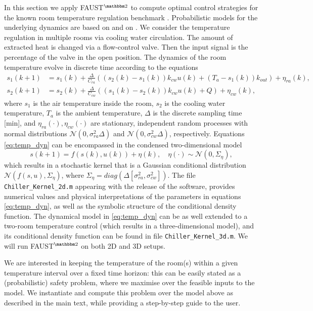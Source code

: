 \documentclass{llncs}
\newcommand{\software}{\textsf{FAUST}$^{\mathbbm 2}$\xspace}
\begin{document}
In this section we apply \software to compute optimal control strategies for the known room temperature regulation benchmark \cite{FI04}.  
Probabilistic models for the underlying dynamics are based on \cite{MC85} and on \cite{APLS08}.
We consider the temperature regulation in multiple rooms via cooling water circulation.
The amount of extracted heat is changed via a flow-control valve.
Then the input signal is the percentage of the valve in the open position. 
The dynamics of the room temperature evolve in discrete time according to the equations 
\begin{align}
s_1(k+1)& = s_1(k)+\frac{\Delta}{C_{ra}}((s_2(k)-s_1(k))k_{cw}u(k)+(T_a-s_1(k))k_{out})+\eta_{ra}(k),\nonumber\\
s_2(k+1)& = s_2(k)+\frac{\Delta}{C_{cw}}((s_1(k)-s_2(k))k_{cw}u(k)+Q)+\eta_{cw}(k),\label{eq:temp_dyn}
\end{align}
where $s_1$ is the air temperature inside the room,
$s_2$ is the cooling water temperature,
$T_a$ is the ambient temperature,
$\Delta$ is the discrete sampling time [min],
and
$\eta_{ra}(\cdot),\eta_{cw}(\cdot)$ are stationary, independent random processes 
with normal distributions $\mathcal{N}(0,\sigma_{ra}^2\Delta)$ and $\mathcal{N}(0,\sigma_{cw}^2\Delta)$, respectively.
Equations \eqref{eq:temp_dyn} can be encompassed in the condensed two-dimensional model 
\begin{equation*}
s(k+1) = f(s(k),u(k))+\eta(k),\quad \eta(\cdot)\sim \mathcal N(0,\varSigma_\eta),
\end{equation*}
which results in a stochastic kernel that is a Gaussian conditional distribution $\mathcal N(f(s,u),\varSigma_\eta)$, 
where $\varSigma_\eta = diag(\Delta[\sigma_{ra}^2,\sigma_{cw}^2])$. 
The file \texttt{Chiller\_Kernel\_2d.m}
appearing with the release of the software,
provides numerical values and physical interpretations of the parameters in equations \eqref{eq:temp_dyn}, 
as well as the symbolic structure of the conditional density function.
The dynamical model in \eqref{eq:temp_dyn} can be as well extended to a two-room temperature control (which results in a three-dimensional model), 
and its conditional density function can be found in file \texttt{Chiller\_Kernel\_3d.m}. 
We will run \software on both 2D and 3D setups. 

We are interested in keeping the temperature of the room(s) within a given temperature interval over a fixed time horizon: 
this can be easily stated as a (probabilistic) safety problem, 
where we maximise over the feasible inputs to the model. 
We instantiate and compute this problem over the model above as described in the main text, 
while providing a step-by-step guide to the user.
\end{document}
